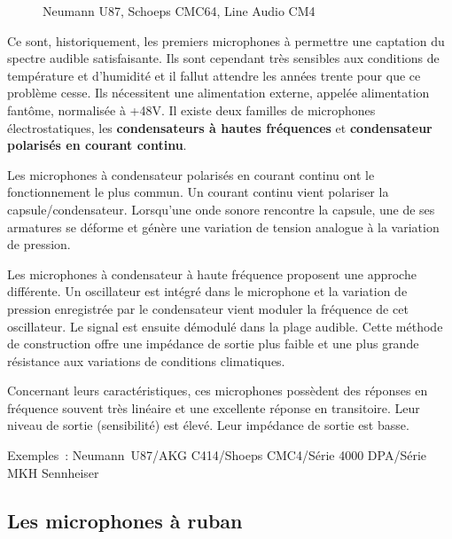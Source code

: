 \documentclass[
  letterpaper,
  DIV=11,
  numbers=noendperiod]{scrreprt}
\begin{document}
\begin{figure}
\begin{minipage}[t]{0.33\linewidth}
{{}

}

\end{minipage}%

\caption{\label{fig-mic_stat}Neumann U87, Schoeps CMC64, Line Audio CM4}

\end{figure}

Ce sont, historiquement, les premiers microphones à permettre une
captation du spectre audible satisfaisante. Ils sont cependant très
sensibles aux conditions de température et d'humidité et il fallut
attendre les années trente pour que ce problème cesse. Ils nécessitent
une alimentation externe, appelée alimentation fantôme, normalisée à
+48V. Il existe deux familles de microphones électrostatiques, les
\textbf{condensateurs à hautes fréquences} et \textbf{condensateur
polarisés en courant continu}.

Les microphones à condensateur polarisés en courant continu ont le
fonctionnement le plus commun. Un courant continu vient polariser la
capsule/condensateur. Lorsqu'une onde sonore rencontre la capsule, une
de ses armatures se déforme et génère une variation de tension analogue
à la variation de pression.

Les microphones à condensateur à haute fréquence proposent une approche
différente. Un oscillateur est intégré dans le microphone et la
variation de pression enregistrée par le condensateur vient moduler la
fréquence de cet oscillateur. Le signal est ensuite démodulé dans la
plage audible. Cette méthode de construction offre une impédance de
sortie plus faible et une plus grande résistance aux variations de
conditions climatiques.

Concernant leurs caractéristiques, ces microphones possèdent des
réponses en fréquence souvent très linéaire et une excellente réponse en
transitoire. Leur niveau de sortie (sensibilité) est élevé. Leur
impédance de sortie est basse.

Exemples~: Neumann~U87/AKG C414/Shoeps CMC4/Série 4000 DPA/Série MKH
Sennheiser

\hypertarget{les-microphones-uxe0-ruban}{%
\subsection{Les microphones à ruban}\label{les-microphones-uxe0-ruban}}
\end{document}
